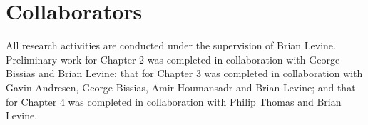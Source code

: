 \paragraph*{}

\paragraph*{}


\section*{Collaborators}
All research activities are conducted under the supervision of Brian Levine. Preliminary work for Chapter 2 was completed in collaboration with George Bissias and Brian Levine; that for Chapter 3 was completed in collaboration with Gavin Andresen, George Bissias, Amir Houmansadr and Brian Levine; and that for Chapter 4 was completed in collaboration with Philip Thomas and Brian Levine.